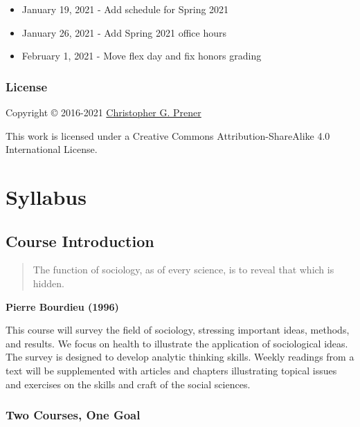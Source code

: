 \documentclass[
]{book}
\providecommand{\tightlist}{%
  \setlength{\itemsep}{0pt}\setlength{\parskip}{0pt}}
\begin{document}
\begin{itemize}
\tightlist
\item
  January 19, 2021 - Add schedule for Spring 2021
\item
  January 26, 2021 - Add Spring 2021 office hours
\item
  February 1, 2021 - Move flex day and fix honors grading
\end{itemize}

\hypertarget{license}{%
\section*{License}\label{license}}

Copyright © 2016-2021 \href{https://chris-prener.github.io}{Christopher G. Prener}

This work is licensed under a Creative Commons Attribution-ShareAlike 4.0 International License.

\hypertarget{part-syllabus}{%
\part{Syllabus}\label{part-syllabus}}

\hypertarget{course-introduction}{%
\chapter{Course Introduction}\label{course-introduction}}

\begin{quote}
The function of sociology, as of every science, is to reveal that which is hidden.
\end{quote}

\textbf{Pierre Bourdieu (1996)}

This course will survey the field of sociology, stressing important ideas, methods, and results. We focus on health to illustrate the application of sociological ideas. The survey is designed to develop analytic thinking skills. Weekly readings from a text will be supplemented with articles and chapters illustrating topical issues and exercises on the skills and craft of the social sciences.

\hypertarget{two-courses-one-goal}{%
\section{Two Courses, One Goal}\label{two-courses-one-goal}}
\end{document}
